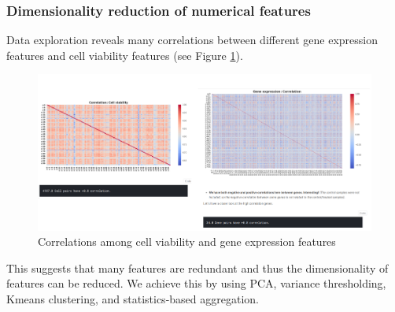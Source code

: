 \documentclass{article}
\begin{document}
\subsubsection{Dimensionality reduction of numerical features}
Data exploration reveals many correlations between different gene expression features and cell viability features (see Figure \ref{fig:correlation_num}). 

\begin{figure}[H]
\begin{center}
	\includegraphics[width=1\textwidth]{pics/correlation_num.png}
    \caption{Correlations among cell viability and gene expression features}
\label{fig:correlation_num}
\end{center}
\end{figure}

This suggests that many features are redundant and thus the dimensionality of features can be reduced. We achieve this by using PCA, variance thresholding, Kmeans clustering, and statistics-based aggregation. 
\end{document}
